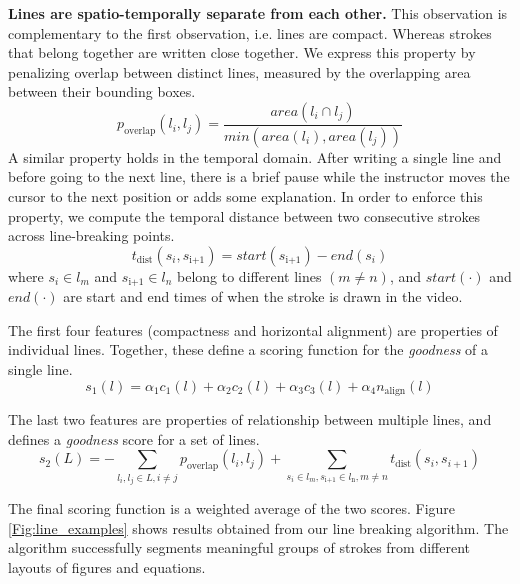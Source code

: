 \textbf{Lines are spatio-temporally separate from each other.} This observation is complementary to the first observation, i.e. lines are compact. Whereas strokes that belong together are written close together. We express this property by penalizing overlap between distinct lines, measured by the overlapping area between their bounding boxes.
\begin{equation}
p_\text{overlap}(l_i, l_j) = \frac{area(l_i\cap l_j)}{min(area(l_i), area(l_j))}
\end{equation}
A similar property holds in the temporal domain. After writing a single line and before going to the next line, there is a brief pause while the instructor moves the cursor to the next position or adds some explanation. In order to enforce this property, we compute the temporal distance between two consecutive strokes across line-breaking points.
\begin{equation}
t_\text{dist}(s_i, s_\text{i+1}) = start(s_\text{i+1}) - end(s_i)
\end{equation}
where $s_i \in l_m$ and $s_\text{i+1} \in l_n$ belong to different lines $(m \neq n)$, and $start(\cdot)$ and $end(\cdot)$ are start and end times of when the stroke is drawn in the video.

The first four features (compactness and horizontal alignment) are properties of individual lines. Together, these define a scoring function for the \textit{goodness} of a single line.
\begin{equation}
s_1(l) = \alpha_1c_1(l) + \alpha_2c_2(l) + \alpha_3c_3(l) + \alpha_4n_\text{align}(l)
\end{equation}

The last two features are properties of relationship between multiple lines, and defines a \textit{goodness} score for a set of lines. 
\begin{equation}
s_2(L) = -\sum \limits_{l_i,l_j\in L, i\neq j}p_\text{overlap}(l_i, l_j) +\sum \limits_{s_i\in l_m, s_\text{i+1} \in l_\text{n}, m \neq n}t_\text{dist}(s_i, s_{i+1})
\end{equation}

The final scoring function is a weighted average of the two scores.
Figure \ref{Fig:line_examples} shows results obtained from our line breaking algorithm. The algorithm successfully segments meaningful groups of strokes from different layouts of figures and equations.


